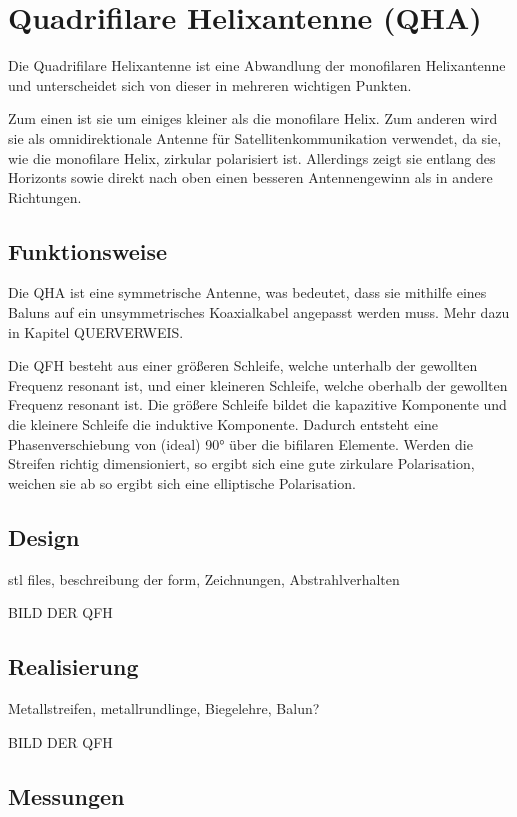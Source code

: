 \chapter{Quadrifilare Helixantenne (QHA)}
\label{chap:qfh}
Die Quadrifilare Helixantenne ist eine Abwandlung der monofilaren Helixantenne und unterscheidet sich von dieser in mehreren wichtigen Punkten.

Zum einen ist sie um einiges kleiner als die monofilare Helix. Zum anderen wird sie als omnidirektionale Antenne für Satellitenkommunikation verwendet, da sie, wie die monofilare Helix, zirkular polarisiert ist. Allerdings zeigt sie entlang des Horizonts sowie direkt nach oben einen besseren Antennengewinn als in andere Richtungen.

\section{Funktionsweise}
Die QHA ist eine symmetrische Antenne, was bedeutet, dass sie mithilfe eines Baluns auf ein unsymmetrisches Koaxialkabel angepasst werden muss. Mehr dazu in Kapitel QUERVERWEIS.

Die QFH besteht aus einer größeren Schleife, welche unterhalb der gewollten Frequenz resonant ist, und einer kleineren Schleife, welche oberhalb der gewollten Frequenz resonant ist. Die größere Schleife bildet die kapazitive Komponente und die kleinere Schleife die induktive Komponente. Dadurch entsteht eine Phasenverschiebung von (ideal) 90° über die bifilaren Elemente. Werden die Streifen richtig dimensioniert, so ergibt sich eine gute zirkulare Polarisation, weichen sie ab so ergibt sich eine elliptische Polarisation.

\section{Design}
stl files, beschreibung der form, Zeichnungen, Abstrahlverhalten 

BILD DER QFH

\section{Realisierung}
Metallstreifen, metallrundlinge, Biegelehre, Balun?

BILD DER QFH

\section{Messungen}

